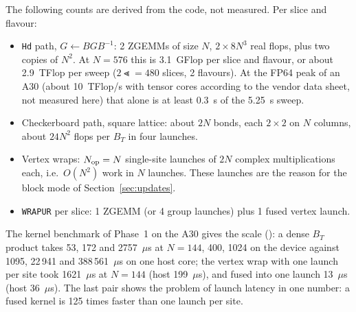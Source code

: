 The following counts are derived from the code, not measured. Per slice and flavour:
\begin{itemize}
\item \texttt{Hd} path, $G\leftarrow BGB^{-1}$: 2 ZGEMMs of size $N$, $2\times8N^3$ real flops, plus two copies of $N^2$. At $N=576$ this is 3.1~GFlop per slice and flavour, or about 2.9~TFlop per sweep ($2\Lt=480$ slices, 2 flavours). At the FP64 peak of an A30 (about 10~TFlop/s with tensor cores according to the vendor data sheet, not measured here) that alone is at least 0.3~s of the 5.25~s sweep.
\item Checkerboard path, square lattice: about $2N$ bonds, each $2\times2$ on $N$ columns, about $24N^2$ flops per $B_T$ in four launches.
\item Vertex wraps: $N_{\rm op}=N$ single-site launches of $2N$ complex multiplications each, i.e.\ $O(N^2)$ work in $N$ launches. These launches are the reason for the block mode of Section~\ref{sec:updates}.
\item \texttt{WRAPUR} per slice: 1 ZGEMM (or 4 group launches) plus 1 fused vertex launch.
\end{itemize}
The kernel benchmark of Phase~1 on the A30 gives the scale (): a dense $B_T$ product takes 53, 172 and 2757~$\mu$s at $N=144$, 400, 1024 on the device against 1095, 22\,941 and 388\,561~$\mu$s on one host core; the vertex wrap with one launch per site took 1621~$\mu$s at $N=144$ (host 199~$\mu$s), and fused into one launch 13~$\mu$s (host 36~$\mu$s). %
The last pair shows the problem of launch latency in one number: a fused kernel is 125 times faster than one launch per site.

